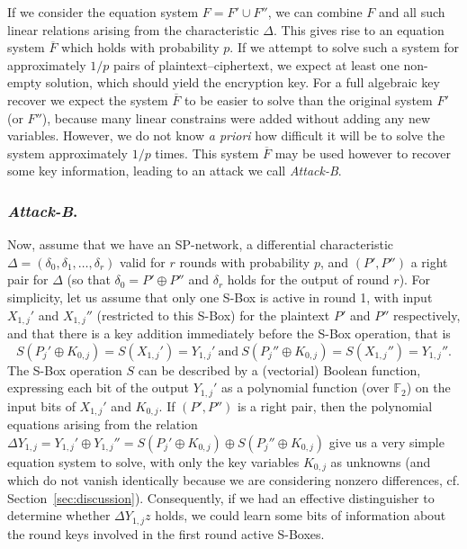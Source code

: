 \documentclass{llncs}
\newcommand{\field}[1]{\mathbb{#1}}
\begin{document}
If we consider the equation system $F = F' \cup F''$, we can combine $F$ and
all such linear relations arising from the characteristic $\Delta$.
This gives rise to an equation system $\overline{F}$ which holds with
probability $p$. If we attempt to solve such a system for
approximately $1/p$ pairs of plaintext--ciphertext, we expect at least one
non-empty solution, which should
yield the encryption key. For a full algebraic key recover we expect the
system $\overline{F}$ to be easier to
solve than the original system $F'$ (or $F''$), because many linear constrains
were added without adding any new variables. However, we do not know \emph{a
priori} how difficult it will be to solve the system approximately $1/p$ times.
This system $\overline{F}$ may be used however to recover some key information,
leading to an attack we call \emph{Attack-B}.

\subsubsection{\emph{Attack-B}.}
Now, assume that we have an SP-network, a differential characteristic $\Delta =
(\delta_0, \delta_1, \ldots , \delta_r)$ valid for $r$ rounds with probability
$p$, and $(P',P'')$ a right pair for $\Delta$ (so that $\delta_0 = P' \oplus
P''$ and $\delta_r$ holds for the output of round $r$). For
simplicity, let us assume that only one S-Box is active in round 1, with input
$X_{1,j}'$ and $X_{1,j}''$ (restricted to this S-Box) for the plaintext $P'$ and
$P''$ respectively, and that there is a key addition immediately before the
S-Box operation, that is $$S(P_j' \oplus K_{0,j}) = S(X_{1,j}') = Y_{1,j}' \
\textrm{and} \ S(P_j'' \oplus K_{0,j}) = S(X_{1,j}'') = Y_{1,j}''.$$
The S-Box operation $S$ can be described by a (vectorial) Boolean
function, expressing each bit of the output $Y_{1,j}'$ as a polynomial function
(over $\field{F}_2$) on the input bits of $X_{1,j}'$ and $K_{0,j}$. If
$(P',P'')$ is a right pair, then the polynomial equations arising from the
relation $\Delta Y_{1,j}= Y_{1,j}' \oplus Y_{1,j}'' = S(P_j' \oplus K_{0,j})
\oplus S(P_j'' \oplus K_{0,j})$
give us a very simple equation system to solve, with only the key variables
$K_{0,j}$ as unknowns (and which do not vanish identically because we are
considering nonzero differences, cf. Section~\ref{sec:discussion}).
Consequently, if we had an effective distinguisher to determine whether
$\Delta Y_{1,j}z$ holds, we could learn some bits of information about the
round keys involved in the first round active S-Boxes.
\end{document}
